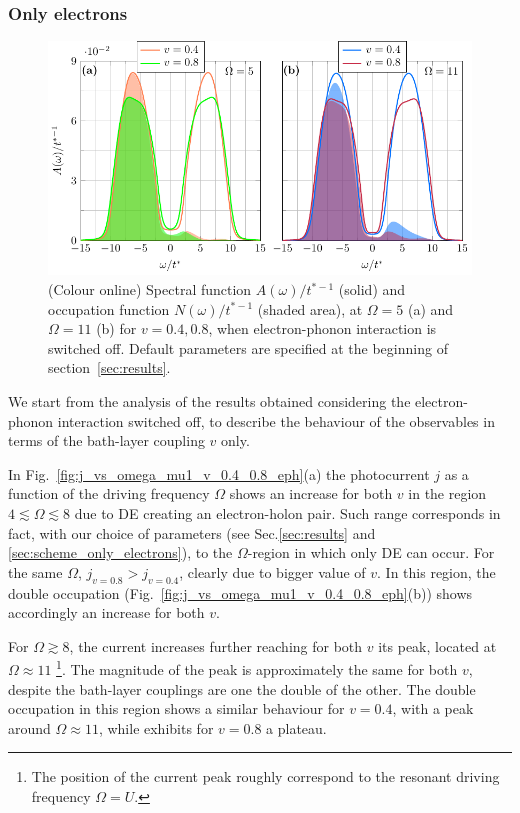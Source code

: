\documentclass[aps,prb,groupedaddress,showpacs,twocolumn,superscriptaddress,10pt]{revtex4-2}
\begin{document}
\subsubsection{Only electrons}
\label{sec:E0_2_only_electrons} 

\begin{figure}[ht] 
\includegraphics[width=\linewidth]{./figures_Paper1/spec_filling_mu1_v_0.4_0.8_O_5_11_e.pdf}
\caption{(Colour online) Spectral function $A(\omega)/t^{* -1}$ (solid) and occupation function $N(\omega)/t^{* -1}$ (shaded area), at $\Omega=5$ (a) and $\Omega=11$ (b) for $v=0.4,0.8$, when electron-phonon interaction is switched off. Default parameters are specified at the beginning of section~\ref{sec:results}.}
\label{fig:spec_filling_mu1_v_0.4_0.8_O_5_11_e}
\end{figure}  

We start from the analysis of the results obtained considering the electron-phonon interaction switched off, to describe the behaviour of the observables in terms of the bath-layer coupling $v$ only. 
 
In Fig.~\ref{fig:j_vs_omega_mu1_v_0.4_0.8_eph}(a) the photocurrent $j$ as a function of the driving frequency $\Omega$ shows an increase for both $v$ in the region $4\lesssim\Omega\lesssim8$ due to DE creating an electron-holon pair. Such range corresponds in fact, with our choice of parameters (see Sec.\ref{sec:results} and \ref{sec:scheme_only_electrons}), to the $\Omega$-region in which only DE can occur. For the same $\Omega$, $j_{v=0.8}>j_{v=0.4}$, clearly due to bigger value of $v$. In this region, the double occupation (Fig.~\ref{fig:j_vs_omega_mu1_v_0.4_0.8_eph}(b)) shows accordingly an increase for both $v$.
  
For $\Omega\gtrsim8$, the current increases further reaching for both $v$ its peak, located at $\Omega\approx 11$ \footnote{The position of the current peak roughly correspond to the resonant driving frequency $\Omega=U$.}. The magnitude of the peak is approximately the same for both $v$, despite the bath-layer couplings are one the double of the other. The double occupation in this region shows a similar behaviour for $v=0.4$, with a peak around $\Omega\approx 11$, while exhibits for $v=0.8$ a plateau. 
\end{document}
